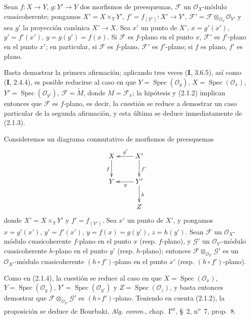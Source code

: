 \begin{proposition}[2.1.4]
\label{IV.2.1.4-fr}
Sean $f:X\to Y$, $g:Y'\to Y$ dos morfismos de preesquemas, $\mathscr F$
un $\mathcal O_X$-módulo cuasicoherente; pongamos $X'=X\times_Y Y'$,
$f'=f_{(Y')}:X'\to Y'$, $\mathscr F'=\mathscr F\otimes_{\mathcal O_Y}\mathcal O_{Y'}$
y sea $g'$ la proyección canónica $X'\to X$. Sea $x'$ un punto de
$X'$, $x=g'(x')$, $y'=f'(x')$, $y=g(y')=f(x)$. Si $\mathscr F$ es $f$-plano
en el punto $x$, $\mathscr F'$ es $f'$-plano en el punto $x'$; en particular, si
$\mathscr F$ es $f$-plano, $\mathscr F'$ es $f'$-plano; si $f$ es plano,
$f'$ es plano.
\end{proposition}

Basta demostrar la primera afirmación; aplicando tres veces (\textbf I, 3.6.5),
así como (\textbf I, 2.4.4), es posible reducirse al caso en que
$Y=\operatorname{Spec}(\mathcal O_y)$, $X=\operatorname{Spec}(\mathcal O_x)$,
$Y'=\operatorname{Spec}(\mathcal O_{y'})$, $\mathscr F=\widetilde M$, donde
$M=\mathscr F_x$; la hipótesis y (2.1.2) implican entonces que $\mathscr F$
es $f$-plano, es decir, la cuestión se reduce a demostrar un caso particular de la
segunda afirmación, y esta última se deduce inmediatamente de (2.1.3).

\begin{proposition}[2.1.5]
\label{IV.2.1.5-fr}
Consideremos un diagrama conmutativo de morfismos de preesquemas
\[
\xymatrix{
  X \ar[d]_f & X' \ar[l]_{g'} \ar[d]^{f'} \\
  Y & Y' \ar[l]^g \ar[d]^h \\
  & Z
}
\]
donde $X'=X\times_Y Y'$ y $f'=f_{(Y')}$. Sea $x'$ un punto de $X'$, y
pongamos $x=g'(x')$, $y'=f'(x')$, $y=f(x)=g(y')$, $z=h(y')$. Sean
$\mathscr F$ un $\mathcal O_X$-módulo cuasicoherente $f$-plano en el punto $x$
(\textup{resp.} $f$-plano), y $\mathscr G'$ un $\mathcal O_{Y'}$-módulo cuasicoherente
$h$-plano en el punto $y'$ (\textup{resp.} $h$-plano); entonces
$\mathscr F\otimes_{\mathcal O_{Y'}}\mathscr G'$ es un $\mathcal O_{X'}$-módulo
cuasicoherente $(h\circ f')$-plano en el punto $x'$ (\textup{resp.} $(h\circ f')$-plano).
\end{proposition}

Como en (2.1.4), la cuestión se reduce al caso en que
$X=\operatorname{Spec}(\mathcal O_x)$, $Y=\operatorname{Spec}(\mathcal O_y)$,
$Y'=\operatorname{Spec}(\mathcal O_{y'})$ y
$Z=\operatorname{Spec}(\mathcal O_z)$, y basta entonces demostrar que
$\mathscr F\otimes_{\mathcal O_{Y'}}\mathscr G'$ es $(h\circ f')$-plano. Teniendo en cuenta
(2.1.2), la proposición se deduce de Bourbaki, \emph{Alg. comm.},
chap.~I\textsuperscript{er}, \S~2, n\textsuperscript{o}~7, prop.~8.

